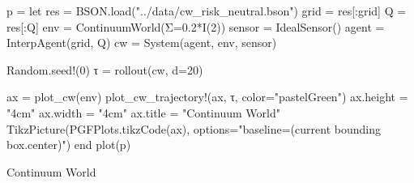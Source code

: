 \begin{jlcode}
    p = let
        res = BSON.load("../data/cw_risk_neutral.bson")
        grid = res[:grid]
        Q = res[:Q]
        env = ContinuumWorld(Σ=0.2*I(2))
        sensor = IdealSensor()
        agent = InterpAgent(grid, Q)
        cw = System(agent, env, sensor)

        Random.seed!(0)
        τ = rollout(cw, d=20)

        ax = plot_cw(env)
        plot_cw_trajectory!(ax, τ, color="pastelGreen")
        ax.height = "4cm"
        ax.width = "4cm"
        ax.title = "Continuum World"
        TikzPicture(PGFPlots.tikzCode(ax), options="baseline=(current bounding box.center)")
    end
    plot(p)
\end{jlcode}

\begin{frame}[fragile,t]{Continuum World}

{\small
\begin{table} %
\end{table}}

\end{frame}
